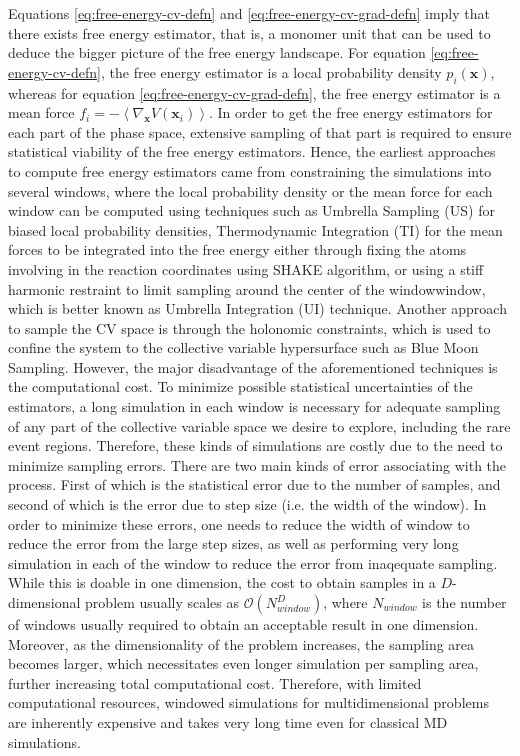 \begin{spacing}{2.0}
    Equations \ref{eq:free-energy-cv-defn} and \ref{eq:free-energy-cv-grad-defn} imply that there exists free energy estimator, that is, a monomer 
    unit that can be used to deduce the bigger picture of the free energy landscape. For equation \ref{eq:free-energy-cv-defn}, the free energy 
    estimator is a local probability density $p_i(\mathbf{x})$, whereas for equation \ref{eq:free-energy-cv-grad-defn}, the free energy estimator 
    is a mean force $f_i = -\left<\nabla_{\mathbf{x}}V(\mathbf{x}_i)\right>$. In order to get the free energy estimators for each part of the phase 
    space, extensive sampling of that part is required to ensure statistical viability of the free energy estimators. Hence, the earliest approaches 
    to compute free energy estimators came from constraining the simulations into several windows, where the local probability density or the mean 
    force for each window can be computed using techniques such as Umbrella Sampling (US) \cite{P-JCompPhys-1977-v23-Torrie,P-WIRES-2011-v1-Kastner}
    for biased local probability densities, Thermodynamic Integration (TI) \cite{P-JChemPhys-1935-v3-Kirkwood} for the mean forces to be integrated 
    into the free energy either through fixing the atoms involving in the reaction coordinates using SHAKE algorithm, or using a stiff harmonic 
    restraint to limit sampling around the center of the windowwindow, which is better known as Umbrella Integration (UI) technique. 
    \cite{P-JChemPhys-2005-v123-Kastner}  Another approach to sample the CV space is through the holonomic constraints, which is used to confine the 
    system to the collective variable hypersurface such as Blue Moon Sampling. \cite{P-ChemPhysLett-1989-v156-Carter,P-ChemPhysChem-2005-v9-Ciccotti}
    However, the major disadvantage of the aforementioned techniques is the computational cost. To minimize possible statistical uncertainties of 
    the estimators, a long simulation in each window is necessary for adequate sampling of any part of the collective variable space we desire to 
    explore, including the rare event regions. Therefore, these kinds of simulations are costly due to the need to minimize sampling errors. There 
    are two main kinds of error associating with the process. First of which is the statistical error due to the number of samples, and second of 
    which is the error due to step size (i.e. the width of the window). In order to minimize these errors, one needs to reduce the width of window 
    to reduce the error from the large step sizes, as well as performing very long simulation in each of the window to reduce the error from 
    inaqequate sampling. While this is doable in one dimension, the cost to obtain samples in a $D$-dimensional problem usually scales as 
    $\mathcal{O}(N_{window}^D)$, where $N_{window}$ is the number of windows usually required to obtain an acceptable result in one dimension. 
    Moreover, as the dimensionality of the problem increases, the sampling area becomes larger, which necessitates even longer simulation per sampling 
    area, further increasing total computational cost. Therefore, with limited computational resources, windowed simulations for multidimensional 
    problems are inherently expensive and takes very long time even for classical MD simulations.


\end{spacing}
